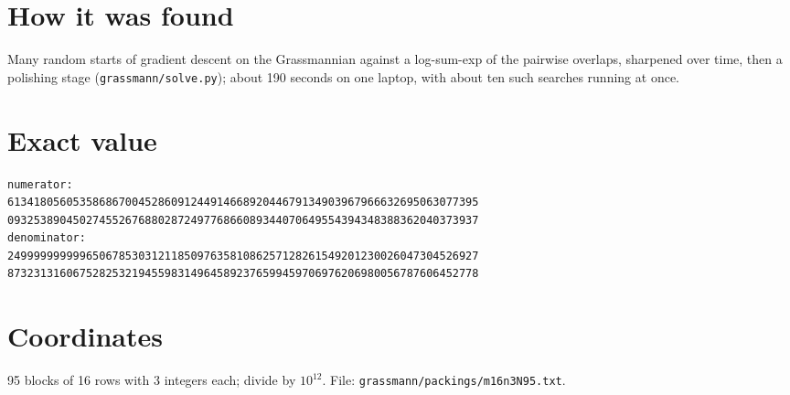 \documentclass[11pt,a4paper]{article}
\begin{document}
\section{How it was found}
Many random starts of gradient descent on the Grassmannian against a log-sum-exp of the pairwise overlaps, sharpened over time, then a polishing stage (\texttt{grassmann/solve.py}); about 190 seconds on one laptop, with about ten such searches running at once.


\appendix
\section{Exact value}
{\small
\begin{verbatim}
numerator:
613418056053586867004528609124491466892044679134903967966632695063077395
093253890450274552676880287249776866089344070649554394348388362040373937
denominator:
249999999999650678530312118509763581086257128261549201230026047304526927
873231316067528253219455983149645892376599459706976206980056787606452778
\end{verbatim}}

\section{Coordinates}
95 blocks of 16 rows with 3 integers each; divide by $10^{12}$. File: \texttt{grassmann/packings/m16n3N95.txt}.
{\tiny
\begin{multicols}{3}
\end{multicols}}
\end{document}
